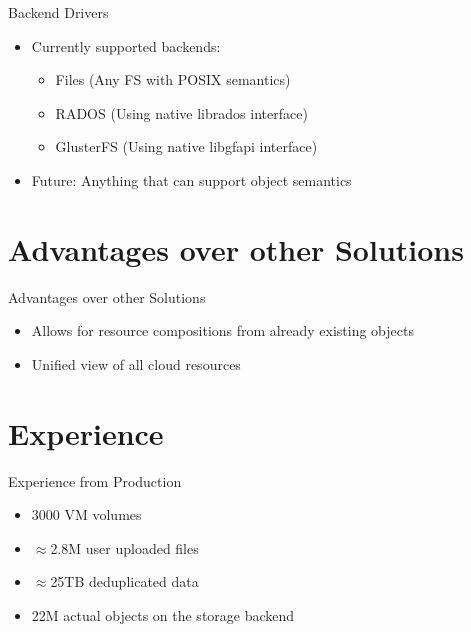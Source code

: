\documentclass[utf8]{beamer}
\begin{document}
\begin{frame}{Backend Drivers}

  \begin{itemize}
    \item Currently supported backends:
      \begin{itemize}
      \item Files (Any FS with POSIX semantics)
      \item RADOS (Using native librados interface)
      \item GlusterFS (Using native libgfapi interface)
      \end{itemize}
    \item Future: Anything that can support object semantics
  \end{itemize}
  
\end{frame}

\section{Advantages over other Solutions}

\begin{frame}{Advantages over other Solutions}

\begin{itemize}
  \item Allows for resource compositions from already existing objects
  \item Unified view of all cloud resources
\end{itemize}

\end{frame}

\section{Experience}

\begin{frame}{Experience from Production}

\begin{itemize}
  \item 3000 VM volumes
  \item $\approx$2.8M user uploaded files
  \item $\approx$25TB deduplicated data
  \item 22M actual objects on the storage backend
\end{itemize}

\end{frame}
\end{document}
